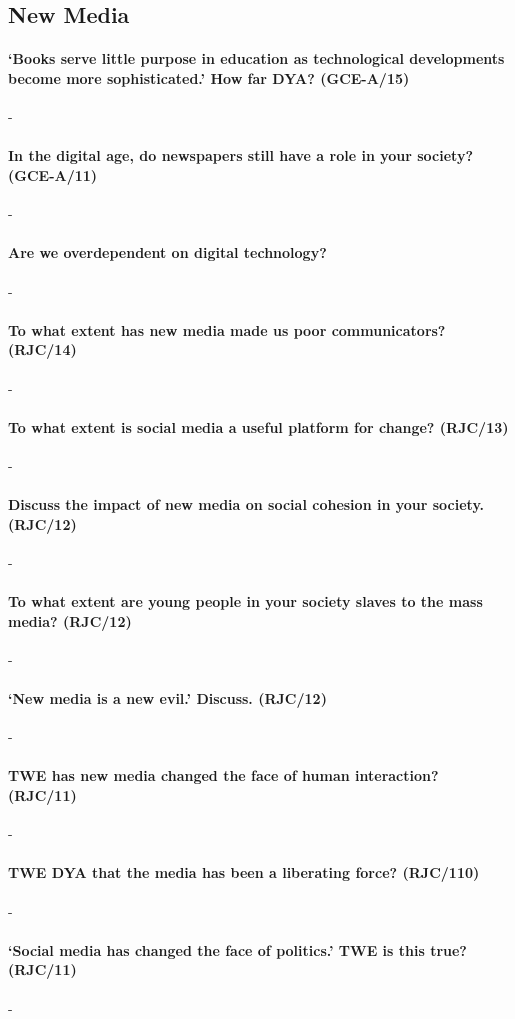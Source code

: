\documentclass[../../main]{subfiles}
\begin{document}
\subsection{New Media}

\paragraph{`Books serve little purpose in education as technological developments become more sophisticated.' How far DYA? (GCE-A/15)}-

\paragraph{In the digital age, do newspapers still have a role in your society? (GCE-A/11)}-

\paragraph{Are we overdependent on digital technology?}-

\paragraph{To what extent has new media made us poor communicators? (RJC/14)}-

\paragraph{To what extent is social media a useful platform for change? (RJC/13)}-

\paragraph{Discuss the impact of new media on social cohesion in your society. (RJC/12)}-

\paragraph{To what extent are young people in your society slaves to the mass media? (RJC/12)}-

\paragraph{`New media is a new evil.' Discuss. (RJC/12)}-

\paragraph{TWE has new media changed the face of human interaction? (RJC/11)}-

\paragraph{TWE DYA that the media has been a liberating force? (RJC/110)}-

\paragraph{`Social media has changed the face of politics.' TWE is this true? (RJC/11)}-
\end{document}
